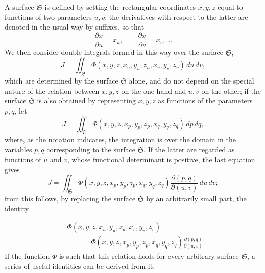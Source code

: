 \documentclass[11pt,a4paper,leqno]{article}
\begin{document}
A surface $\mathfrak{S}$ is defined by setting the rectangular coordinates $x,y,z$ equal to functions of two parameters $u,v$; the derivatives with respect to the latter are denoted in the usual way by suffixes, so that
\[
\frac{\partial x}{\partial u}=x_u,
\qquad
\frac{\partial x}{\partial v}=x_v,\ldots
\]
We then consider double integrals formed in this way over the surface $\mathfrak{S}$,
\[
J=\iint_{\mathfrak{S}}
\Phi(x,y,z,x_u,y_u,z_u,x_v,y_v,z_v)\,du\,dv,
\]
which are determined by the surface $\mathfrak{S}$ alone, and do not depend on the special nature of the relation between $x,y,z$ on the one hand and $u,v$ on the other; if the surface $\mathfrak{S}$ is also obtained by representing $x,y,z$ as functions of the parameters $p,q$, let
\[
J=\iint_{\mathfrak{S}}
\Phi(x,y,z,x_p,y_p,z_p,x_q,y_q,z_q)\,dp\,dq,
\]
where, as the notation indicates, the integration is over the domain in the variables $p,q$ corresponding to the surface $\mathfrak{S}$. If the latter are regarded as functions of $u$ and $v$, whose functional determinant is positive, the last equation gives
\[
J=\iint_{\mathfrak{S}}
\Phi(x,y,z,x_p,y_p,z_p,x_q,y_q,z_q)
\frac{\partial(p,q)}{\partial(u,v)}\,du\,dv;
\]
from this follows, by replacing the surface $\mathfrak{S}$ by an arbitrarily small part, the identity

\begin{equation}\tag{1}
\begin{aligned}
&\Phi(x,y,z,x_u,y_u,z_u,x_v,y_v,z_v)\\
&\qquad=
\Phi(x,y,z,x_p,y_p,z_p,x_q,y_q,z_q)
\frac{\partial(p,q)}{\partial(u,v)}.
\end{aligned}
\end{equation}
If the function $\Phi$ is such that this relation holds for every arbitrary surface $\mathfrak{S}$, a series of useful identities can be derived from it.
\end{document}
